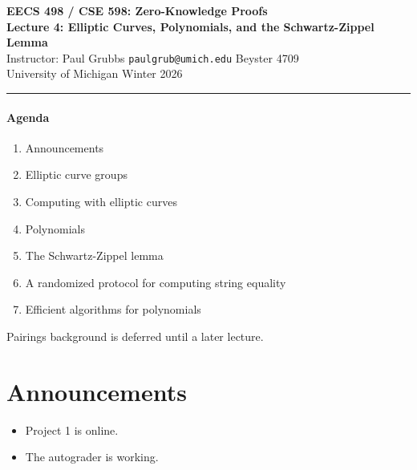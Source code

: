 \documentclass[11pt]{article}
\begin{document}

\begin{center}
  {\Large \textbf{EECS 498 / CSE 598: Zero-Knowledge Proofs}} \\[4pt]
  {\large \textbf{Lecture 4: Elliptic Curves, Polynomials, and the Schwartz-Zippel Lemma}} \\[4pt]
  {\normalsize Instructor: Paul Grubbs \quad
   \texttt{paulgrub@umich.edu} \quad Beyster 4709} \\[2pt]
  {\normalsize University of Michigan \quad Winter 2026}
\end{center}

\medskip
\hrule
\medskip

\paragraph{Agenda}
\begin{enumerate}[label=(\arabic*)]
  \item Announcements
  \item Elliptic curve groups
  \item Computing with elliptic curves
  \item Polynomials
  \item The Schwartz-Zippel lemma
  \item A randomized protocol for computing string equality
  \item Efficient algorithms for polynomials
\end{enumerate}

\medskip

\begin{tcolorbox}[colback=blue!5!white, colframe=blue!40!black, title=Note]
Pairings background is deferred until a later lecture.
\end{tcolorbox}

\bigskip

\section{Announcements}

\begin{itemize}
  \item Project 1 is online.
  \item The autograder is working.
\end{itemize}
\end{document}
